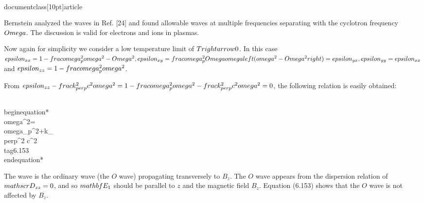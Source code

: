 \\documentclass[10pt]{article}
\begin{document}
{{{{Bernstein analyzed the waves in Ref. [24] and found allowable waves at multiple frequencies separating with the cyclotron frequency $\\Omega$. The discussion is valid for electrons and ions in plasmas.

Now again for simplicity we consider a low temperature limit of $T \\rightarrow 0$. In this case $\\epsilon_{x x}=1-\\frac{\\omega_{p}^{2}}{\\omega^{2}-\\Omega^{2}}, \\epsilon_{x y}=\\frac{\\omega_{p}^{2} \\Omega}{\\omega\\left(\\omega^{2}-\\Omega^{2}\\right)}=\\epsilon_{y x}, \\epsilon_{y y}=\\epsilon_{x x}$ and $\\epsilon_{z z}=1-\\frac{\\omega_{p}^{2}}{\\omega^{2}}$.

From $\\epsilon_{z z}-\\frac{k_{\\perp}^{2} c^{2}}{\\omega^{2}}=1-\\frac{\\omega_{p}^{2}}{\\omega^{2}}-\\frac{k_{\\perp}^{2} c^{2}}{\\omega^{2}}=0$, the following relation is easily obtained:


\\begin{equation*}
\\omega^{2}=\\omega_{p}^{2}+k_{\\perp}^{2} c^{2} \\tag{6.153}
\\end{equation*}


The wave is the ordinary wave (the $O$ wave) propagating transversely to $B_{z}$. The $O$ wave appears from the dispersion relation of $\\mathscr{D}_{z z}=0$, and so $\\mathbf{E}_{1}$ should be parallel to $z$ and the magnetic field $B_{z}$. Equation (6.153) shows that the $O$ wave is not affected by $B_{z}$.

}}}}
\end{document}
